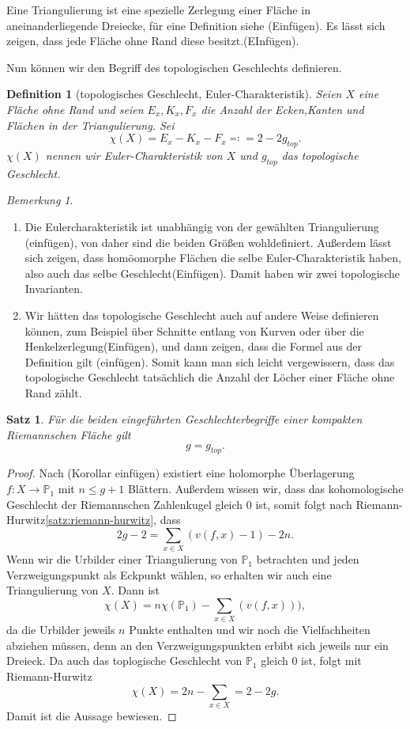 \documentclass[11pt,a4paper,toc=bibliography]{scrartcl}
\theoremstyle{thm}
\newtheorem{satz}{Satz}[section]
\theoremstyle{def}
\newtheorem{defi}{Definition}[section]
\theoremstyle{remark}
\newtheorem*{bem}{Bemerkung}
\begin{document}
Eine Triangulierung ist eine spezielle Zerlegung einer Fläche in aneinanderliegende Dreiecke, für eine Definition siehe (Einfügen). Es lässt sich zeigen, dass jede Fläche ohne Rand diese besitzt.(EInfügen). 

Nun können wir den Begriff des topologischen Geschlechts definieren. 
\begin{defi}[topologisches Geschlecht, Euler-Charakteristik]
	Seien $X$ eine Fläche ohne Rand und seien $E_x,K_x,F_x$ die Anzahl der Ecken,Kanten und Flächen in der Triangulierung. Sei 
	\[
	\chi (X) = E_x-K_x-F_x\eqqcolon = 2-2g_{top}.
	\]
	$\chi(X)$ nennen wir \emph{Euler-Charakteristik} von $X$ und $g_{top}$ das \emph{topologische Geschlecht}. 
\end{defi}
\begin{bem}
	\begin{enumerate}
		\item Die Eulercharakteristik ist unabhängig von der gewählten Triangulierung (einfügen), von daher sind die beiden Größen wohldefiniert. Außerdem lässt sich zeigen, dass homöomorphe Flächen die selbe Euler-Charakteristik haben, also auch das selbe Geschlecht(Einfügen). Damit haben wir zwei topologische Invarianten. 
		\item Wir hätten das topologische Geschlecht auch auf andere Weise definieren können, zum Beispiel über Schnitte entlang von Kurven oder über die Henkelzerlegung(Einfügen), und dann zeigen, dass die Formel aus der Definition gilt (einfügen). Somit kann man sich leicht vergewissern, dass das topologische Geschlecht tatsächlich die Anzahl der Löcher einer Fläche ohne Rand zählt.
		\end{enumerate}
\end{bem}
\begin{satz}
	Für die beiden eingeführten Geschlechterbegriffe einer kompakten Riemannschen Fläche gilt \[
	g = g_{top}.
	\]
\end{satz}
\begin{proof}
	Nach (Korollar einfügen)  existiert eine holomorphe Überlagerung $f:X\rightarrow \mathbb{P}_1$ mit $n\leq g+1$ Blättern. Außerdem wissen wir, dass das kohomologische Geschlecht der Riemannschen Zahlenkugel gleich $0$ ist, somit folgt nach Riemann-Hurwitz\ref{satz:riemann-hurwitz}, dass 
	\[
	2g-2 =\sum_{x\in X}(v(f,x)-1) -2n. 
	\]
	Wenn wir die Urbilder einer Triangulierung von $\mathbb{P}_1$ betrachten und jeden Verzweigungspunkt als Eckpunkt wählen, so erhalten wir auch eine Triangulierung von $X$.
	Dann ist 
	\[
	\chi(X) = n\chi(\mathbb{P}_1)-\sum_{x\in X}(v(f,x))),
	\]
	da die Urbilder jeweils $n$ Punkte enthalten und wir noch die Vielfachheiten abziehen müssen, denn an den Verzweigungspunkten erbibt sich jeweils nur ein Dreieck.
	Da auch das toplogische Geschlecht von $\mathbb{P}_1$ gleich $0$ ist, folgt mit Riemann-Hurwitz
	\[
	\chi(X) = 2n-\sum_{x\in X} = 2-2g.
	\]
	Damit ist die Aussage bewiesen.
\end{proof}
\newpage
\end{document}

